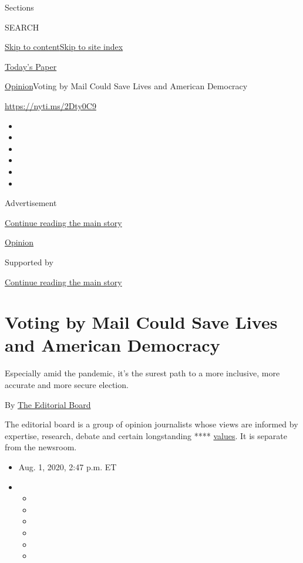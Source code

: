 Sections

SEARCH

\protect\hyperlink{site-content}{Skip to
content}\protect\hyperlink{site-index}{Skip to site index}

\href{https://myaccount.nytimes3xbfgragh.onion/auth/login?response_type=cookie\&client_id=vi}{}

\href{https://www.nytimes3xbfgragh.onion/section/todayspaper}{Today's
Paper}

\href{/section/opinion}{Opinion}\textbar{}Voting by Mail Could Save
Lives and American Democracy

\url{https://nyti.ms/2Dty0C9}

\begin{itemize}
\item
\item
\item
\item
\item
\item
\end{itemize}

Advertisement

\protect\hyperlink{after-top}{Continue reading the main story}

\href{/section/opinion}{Opinion}

Supported by

\protect\hyperlink{after-sponsor}{Continue reading the main story}

\hypertarget{voting-by-mail-could-save-lives-and-american-democracy}{%
\section{Voting by Mail Could Save Lives and American
Democracy}\label{voting-by-mail-could-save-lives-and-american-democracy}}

Especially amid the pandemic, it's the surest path to a more inclusive,
more accurate and more secure election.

By
\href{https://www.nytimes3xbfgragh.onion/interactive/opinion/editorialboard.html}{The
Editorial Board}

The editorial board is a group of opinion journalists whose views are
informed by expertise, research, debate and certain longstanding ****
\href{https://www.nytimes3xbfgragh.onion/interactive/2018/opinion/editorialboard.html}{values}.
It is separate from the newsroom.

\begin{itemize}
\item
  Aug. 1, 2020, 2:47 p.m. ET
\item
  \begin{itemize}
  \item
  \item
  \item
  \item
  \item
  \item
  \end{itemize}
\end{itemize}

